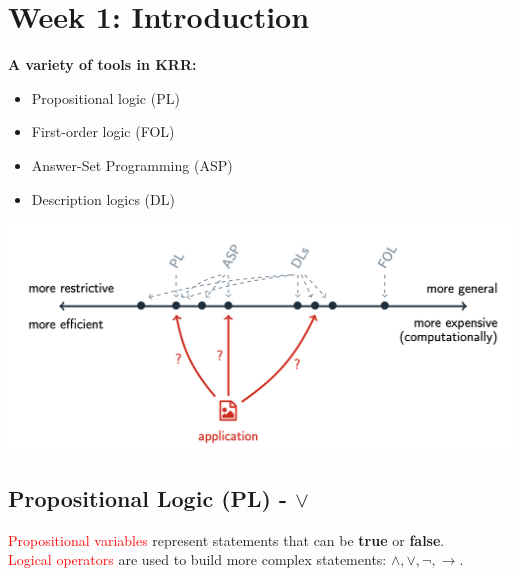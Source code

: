 \section{Week 1: Introduction}
\begin{minipage}{.45\textwidth}
\textbf{A variety of tools in KRR:}
    \begin{itemize}
        \item Propositional logic (PL)
        \item First-order logic (FOL)
        \item Answer-Set Programming (ASP)
        \item Description logics (DL)
    \end{itemize}
\end{minipage}
\begin{minipage}{.45\textwidth}
  \includegraphics[scale=0.4]{figures/tradeoff.png}
\end{minipage}
\vspace{1cm}

\subsection{Propositional Logic (PL) - $\vee$} 
\textcolor{red}{Propositional variables} represent statements that can be \textbf{true} or \textbf{false}. \\
\textcolor{red}{Logical operators} are used to build more complex statements: $\wedge, \vee, \neg, \rightarrow$.

